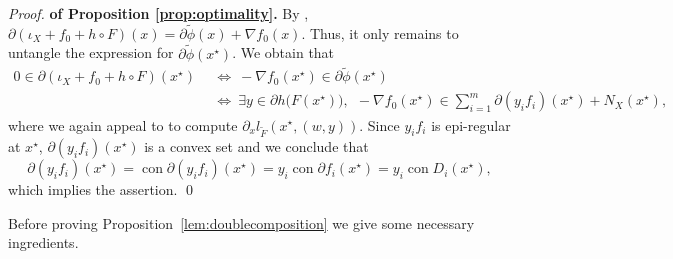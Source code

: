 \documentclass[smallextended,envcountsect]{svjour3}
\DeclareMathOperator{\con}{con}
\begin{document}
\begin{proof} {\bf of Proposition \ref{prop:optimality}.}
By \cite[Proposition 4.58(c)]{Royset_Wets_2021}, $\partial (\iota_X + f_0 + h \circ F)(x) = \partial \tilde\phi(x) + \nabla f_0(x)$. Thus, it only remains to untangle the expression for $\partial \tilde\phi(x^\star)$. We obtain that
\begin{align*}
0 \in \partial (\iota_X + f_0 + h \circ F)(x^\star) ~~ &\Longleftrightarrow ~-\nabla f_0(x^\star) \in \partial \tilde \phi(x^\star)\\
 & \Longleftrightarrow ~ \exists y \in \partial h\big(F(x^\star)\big), ~~ -\nabla f_0(x^\star) \in \sum_{i=1}^m  \partial (y_i f_i)(x^\star) + N_X(x^\star),
\end{align*}
where we again appeal to \cite[Example 4.70]{Royset_Wets_2021} to compute $\partial_x l_{\tilde F}(x^\star,(w,y))$. Since $y_if_i$ is epi-regular at $x^\star$, $\partial (y_if_i)(x^\star)$ is a convex set and we conclude that
\[
\partial (y_i f_i)(x^\star) = \con \partial (y_i f_i)(x^\star) = y_i \con \partial f_i(x^\star) = y_i \con D_i(x^\star),
\]
which implies the assertion. \qed
\end{proof}












Before proving Proposition~\ref{lem:doublecomposition} we give some necessary ingredients. 
\end{document}
